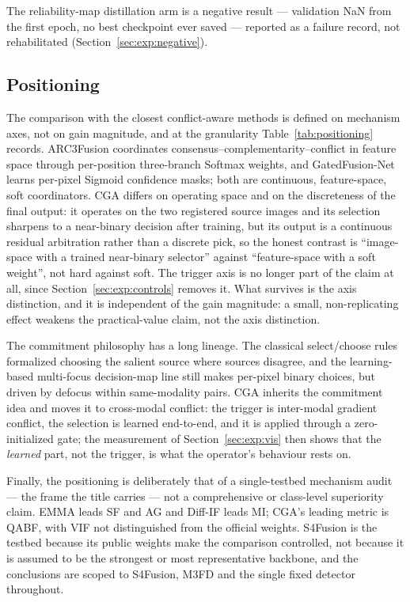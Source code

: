 \documentclass[pdflatex,sn-mathphys-num]{sn-jnl}
\theoremstyle{thmstyleone}%
\theoremstyle{thmstyletwo}%
\theoremstyle{thmstylethree}%
\begin{document}
The reliability-map distillation arm is a negative result --- validation NaN from the first epoch, no best checkpoint ever saved --- reported as a failure record, not rehabilitated (Section~\ref{sec:exp:negative}).

\subsection{Positioning}\label{sec:discussion:positioning}

The comparison with the closest conflict-aware methods is defined on mechanism axes, not on gain magnitude, and at the granularity Table~\ref{tab:positioning} records. ARC3Fusion \cite{tian2026adaptive} coordinates consensus--complementarity--conflict in feature space through per-position three-branch Softmax weights, and GatedFusion-Net \cite{brenner2026gatedfusion} learns per-pixel Sigmoid confidence masks; both are continuous, feature-space, soft coordinators. CGA differs on operating space and on the discreteness of the final output: it operates on the two registered source images and its selection sharpens to a near-binary decision after training, but its output is a continuous residual arbitration rather than a discrete pick, so the honest contrast is ``image-space with a trained near-binary selector'' against ``feature-space with a soft weight'', not hard against soft. The trigger axis is no longer part of the claim at all, since Section~\ref{sec:exp:controls} removes it. What survives is the axis distinction, and it is independent of the gain magnitude: a small, non-replicating effect weakens the practical-value claim, not the axis distinction.

The commitment philosophy has a long lineage. The classical select/choose rules \cite{burt1993enhanced,zhang1999categorization,piella2003general} formalized choosing the salient source where sources disagree, and the learning-based multi-focus decision-map line \cite{ma2021endtoend} still makes per-pixel binary choices, but driven by defocus within same-modality pairs. CGA inherits the commitment idea and moves it to cross-modal conflict: the trigger is inter-modal gradient conflict, the selection is learned end-to-end, and it is applied through a zero-initialized gate; the measurement of Section~\ref{sec:exp:vis} then shows that the \emph{learned} part, not the trigger, is what the operator's behaviour rests on.

Finally, the positioning is deliberately that of a single-testbed mechanism audit --- the frame the title carries --- not a comprehensive or class-level superiority claim. EMMA leads SF and AG and Diff-IF leads MI; CGA's leading metric is QABF, with VIF not distinguished from the official weights. S4Fusion is the testbed because its public weights make the comparison controlled, not because it is assumed to be the strongest or most representative backbone, and the conclusions are scoped to S4Fusion, M3FD and the single fixed detector throughout.
\end{document}
